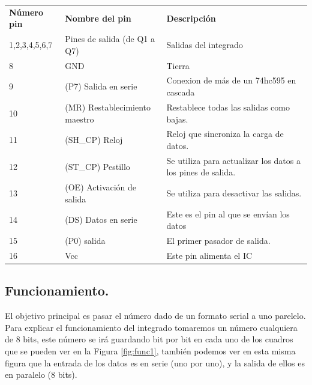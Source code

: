 \documentclass{article}
\begin{document}
\begin{table}
\centering
\begin{tabular}{lll}
\textbf{Número pin} & \textbf{Nombre del pin}       & \textbf{Descripción}                                              \\
1,2,3,4,5,6,7       & Pines de salida (de Q1 a Q7)  & Salidas del integrado  \\
8                   & GND                        & Tierra                                                \\
9                   & (P7) Salida en serie          & Conexion de más de un 74hc595 en cascada                          \\
10                  & (MR) Restablecimiento maestro & Restablece todas las salidas como bajas.                          \\
11                  & (SH\_CP) Reloj                & Reloj que sincroniza la carga de datos.                                          \\
12                  & (ST\_CP) Pestillo             & Se utiliza para actualizar los datos a los pines de salida.        \\
13                  & (OE) Activación de salida     & Se utiliza para desactivar las salidas.                           \\
14                  & (DS) Datos en serie           & Este es el pin al que se envían los datos                          \\
15                  & (P0) salida                   & El primer pasador de salida.                                      \\
16                  & Vcc                           & Este pin alimenta el IC                                          
\end{tabular}
\end{table}

\subsection{Funcionamiento.}\label{integrado funcionamiento}
El objetivo principal es pasar el número dado de un formato serial a uno parelelo. Para explicar el funcionamiento del integrado tomaremos un número cualquiera de 8 bits, este número se irá guardando bit por bit en cada uno de los cuadros que se pueden ver en la Figura \ref{fig:func1}, también podemos ver en esta misma figura que la entrada de los datos es en serie (uno por uno), y la salida de ellos es en paralelo (8 bits).
\end{document}
